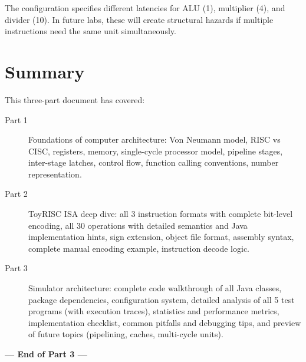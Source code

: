 \documentclass[12pt,a4paper]{article}
\begin{document}
The configuration specifies different latencies for ALU (1), multiplier (4), and divider (10). In future labs, these will create structural hazards if multiple instructions need the same unit simultaneously.

\section{Summary}

This three-part document has covered:

\begin{description}
    \item[Part 1] Foundations of computer architecture: Von Neumann model, RISC vs CISC, registers, memory, single-cycle processor model, pipeline stages, inter-stage latches, control flow, function calling conventions, number representation.

    \item[Part 2] ToyRISC ISA deep dive: all 3 instruction formats with complete bit-level encoding, all 30 operations with detailed semantics and Java implementation hints, sign extension, object file format, assembly syntax, complete manual encoding example, instruction decode logic.

    \item[Part 3] Simulator architecture: complete code walkthrough of all Java classes, package dependencies, configuration system, detailed analysis of all 5 test programs (with execution traces), statistics and performance metrics, implementation checklist, common pitfalls and debugging tips, and preview of future topics (pipelining, caches, multi-cycle units).
\end{description}

\vspace{1cm}
\begin{center}
\textbf{--- End of Part 3 ---}
\end{center}
\end{document}
